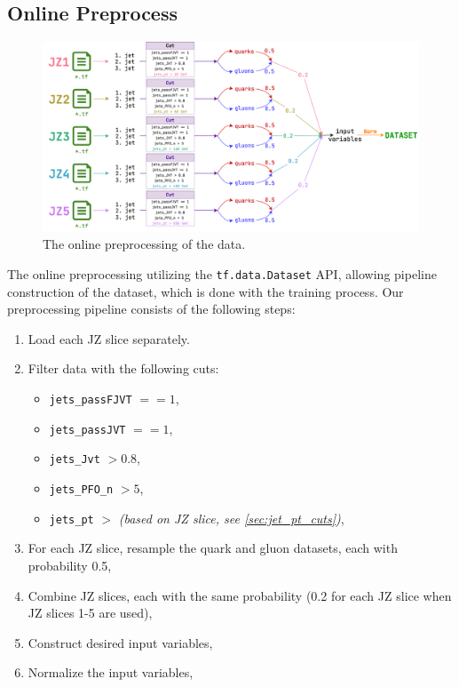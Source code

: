 \subsection{Online Preprocess}
\label{sec:online_preprocess}
\begin{figure}[!ht]
    \centering
    \includegraphics[width=1.\textwidth]{src/diagrams/data_prep_on.png}
    \caption{The online preprocessing of the data.}
    \label{fig:data_prep_on}
\end{figure}
The online preprocessing utilizing the \texttt{tf.data.Dataset} API, allowing pipeline construction of the dataset, which is done with the training process. 
Our preprocessing pipeline consists of the following steps:
\begin{enumerate}
    \item Load each JZ slice separately.
    \item Filter data with the following cuts:
    \begin{itemize}
        \item \texttt{jets\_passFJVT} $== 1$,
        \item \texttt{jets\_passJVT} $== 1$,
        \item \texttt{jets\_Jvt} $> 0.8$,
        \item \texttt{jets\_PFO\_n} $> 5$,
        \item \texttt{jets\_pt} $>$ \textit{(based on JZ slice, see \cref{sec:jet_pt_cuts})},
    \end{itemize}
    \item For each JZ slice, resample the quark and gluon datasets, each with probability 0.5,  
    \item Combine JZ slices, each with the same probability (0.2 for each JZ slice when JZ slices 1-5 are used),
    \item Construct desired input variables,
    \item Normalize the input variables,
\end{enumerate}

